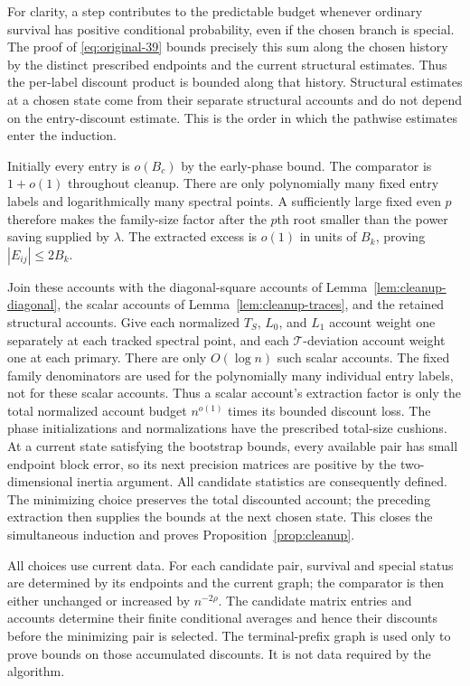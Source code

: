 For clarity, a step contributes to the predictable budget
whenever ordinary survival has positive conditional probability,
even if the chosen branch is special.  The
proof of \eqref{eq:original-39} bounds precisely this sum
along the chosen history by the distinct prescribed
endpoints and the current structural estimates.  Thus the
per-label discount product is bounded along that history.
Structural estimates at a chosen state come from their
separate structural accounts and do not depend on the
entry-discount estimate.  This is the order in which the
pathwise estimates enter the induction.

Initially every entry is $o(B_c)$ by the early-phase bound.
The comparator is $1+o(1)$ throughout cleanup.  There are
only polynomially many fixed entry labels and logarithmically
many spectral points.  A sufficiently large fixed even $p$
therefore makes the family-size factor after the $p$th root
smaller than the power saving supplied by $\lambda$.
The extracted excess is $o(1)$ in units of $B_k$, proving
$|E_{ij}|\leq2B_k$.

Join these accounts with the diagonal-square accounts of
Lemma~\ref{lem:cleanup-diagonal}, the scalar accounts of
Lemma~\ref{lem:cleanup-traces}, and the retained structural
accounts.  Give each normalized $T_S$, $L_0$, and $L_1$ account
weight one separately at each tracked spectral point, and each
$\mathcal T$-deviation account weight one at each primary.
There are only $O(\log n)$ such
scalar accounts.  The fixed family denominators are used for
the polynomially many individual entry labels, not for these
scalar accounts.  Thus a scalar account's extraction factor is
only the total normalized account budget $n^{o(1)}$ times its
bounded discount loss.  The phase initializations and
normalizations have the prescribed total-size cushions.
At a current state satisfying the bootstrap bounds, every available
pair has small endpoint block error,
so its next precision matrices are positive by the
two-dimensional inertia argument.  All candidate statistics
are consequently defined.  The minimizing choice preserves
the total discounted account; the preceding extraction
then supplies the bounds at the next chosen state.  This
closes the simultaneous induction and proves
Proposition~\ref{prop:cleanup}.

All choices use current data.  For each candidate pair, survival and
special status are determined by its endpoints and the current graph;
the comparator is then either unchanged or increased by $n^{-2\rho}$.
The candidate matrix entries and accounts determine their finite
conditional averages and hence their discounts before the minimizing
pair is selected.  The terminal-prefix graph is used only to prove
bounds on those accumulated discounts.  It is not data required by the
algorithm.
